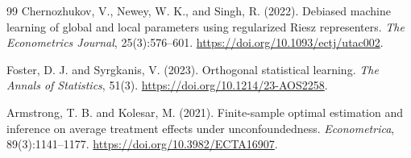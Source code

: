 \documentclass[11pt]{article}
\theoremstyle{definition}
\theoremstyle{plain}
\theoremstyle{remark}
\begin{document}
\begin{thebibliography}{99}
Chernozhukov, V., Newey, W. K., and Singh, R. (2022).
Debiased machine learning of global and local parameters using regularized
Riesz representers.
\emph{The Econometrics Journal}, 25(3):576--601.
\url{https://doi.org/10.1093/ectj/utac002}.

Foster, D. J. and Syrgkanis, V. (2023).
Orthogonal statistical learning.
\emph{The Annals of Statistics}, 51(3).
\url{https://doi.org/10.1214/23-AOS2258}.

Armstrong, T. B. and Kolesar, M. (2021).
Finite-sample optimal estimation and inference on average treatment effects
under unconfoundedness.
\emph{Econometrica}, 89(3):1141--1177.
\url{https://doi.org/10.3982/ECTA16907}.
\end{thebibliography}
\end{document}

